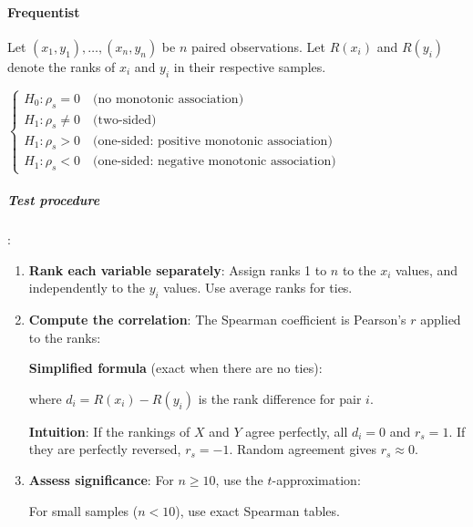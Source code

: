 \paragraph{Frequentist}

Let $(x_1, y_1), \ldots, (x_n, y_n)$ be $n$ paired observations. Let $R(x_i)$ and
$R(y_i)$ denote the ranks of $x_i$ and $y_i$ in their respective samples.

$\begin{cases}
    H_0: \rho_s = 0 \quad \text{(no monotonic association)} \\
    H_1: \rho_s \neq 0 \quad \text{(two-sided)} \\
    H_1: \rho_s > 0 \quad \text{(one-sided: positive monotonic association)} \\
    H_1: \rho_s < 0 \quad \text{(one-sided: negative monotonic association)}
\end{cases}$

\subparagraph{Test procedure}:

\begin{enumerate}
    \item \textbf{Rank each variable separately}: Assign ranks 1 to $n$ to the $x_i$
        values, and independently to the $y_i$ values. Use average ranks for ties.

    \item \textbf{Compute the correlation}: The Spearman coefficient is Pearson's $r$
        applied to the ranks:
        \begin{center}
        \end{center}

        \textbf{Simplified formula} (exact when there are no ties):
        \begin{center}
        \end{center}
        where $d_i = R(x_i) - R(y_i)$ is the rank difference for pair $i$.

        \textbf{Intuition}: If the rankings of $X$ and $Y$ agree perfectly, all $d_i = 0$
        and $r_s = 1$. If they are perfectly reversed, $r_s = -1$. Random agreement gives
        $r_s \approx 0$.

    \item \textbf{Assess significance}: For $n \geq 10$, use the $t$-approximation:
        \begin{center}
        \end{center}
        For small samples ($n < 10$), use exact Spearman tables.
\end{enumerate}

